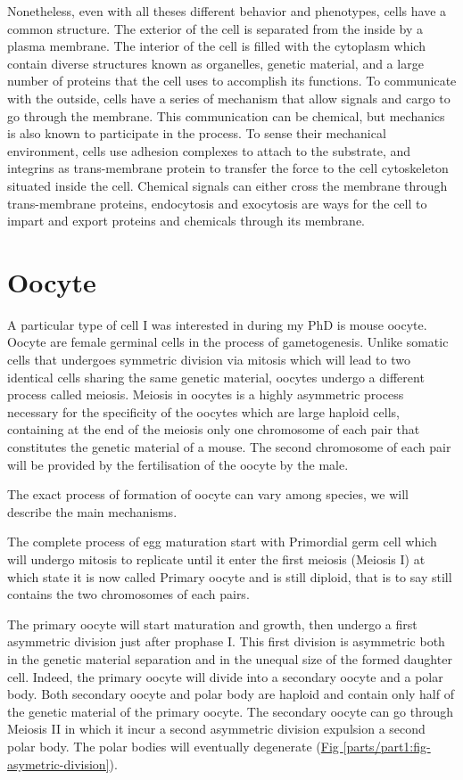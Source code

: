 \documentclass[A4paperpaper,11pt,english]{sphinxmanual}
\begin{document}
Nonetheless, even with all theses different behavior and phenotypes, cells
have a common structure. The exterior of the cell is separated from the
inside by a plasma membrane. The interior of the cell is filled with the cytoplasm
which contain diverse structures known as organelles, genetic material, and
a large number of proteins that the cell uses to accomplish its functions. To
communicate with the outside, cells have a series of mechanism that allow signals
and cargo to go through the membrane. This communication can be chemical, but
mechanics is also known to participate in the process. To sense their
mechanical environment, cells use adhesion complexes to attach to the
substrate, and integrins as trans-membrane protein to transfer the force to the
cell cytoskeleton situated inside the cell. Chemical signals can either cross
the membrane through trans-membrane proteins, endocytosis and exocytosis are
ways for the cell to impart and export proteins and chemicals through its membrane.


\section{Oocyte}
\label{parts/part1:oocyte}
A particular type of cell I was interested in during my PhD is mouse oocyte.
Oocyte are female germinal cells in the process of gametogenesis. Unlike
somatic cells that undergoes symmetric division via mitosis  which will lead to
two identical cells sharing the same genetic material, oocytes undergo a
different process called meiosis.  Meiosis in oocytes is a highly asymmetric
process necessary for the specificity of the oocytes which are large haploid
cells, containing at the end of the meiosis only one chromosome of each pair
that constitutes the genetic material of a mouse. The second chromosome of each pair
will be provided by the fertilisation of the oocyte by the male.

The exact process of formation of oocyte can vary among species, we will
describe the main mechanisms.

The complete process of egg maturation start with Primordial germ cell which
will undergo mitosis to replicate until it enter the first meiosis (Meiosis I)
at which state it is now called Primary oocyte and is still diploid, that is to say still contains the two chromosomes of each pairs.

The primary oocyte will start maturation and growth, then undergo a first
asymmetric division just after prophase I.  This first division is asymmetric
both in  the genetic material separation and in the unequal size of the formed
daughter cell. Indeed, the primary oocyte will divide into a secondary oocyte
and a polar body. Both secondary oocyte and polar body are haploid and contain
only half of the genetic material of the primary oocyte.  The secondary oocyte
can go through Meiosis II in which it incur a second asymmetric division
expulsion a second polar body. The polar bodies will eventually degenerate
(\hyperref[parts/part1:fig-asymetric-division]{Fig  \ref*{parts/part1:fig-asymetric-division}}).
\end{document}
